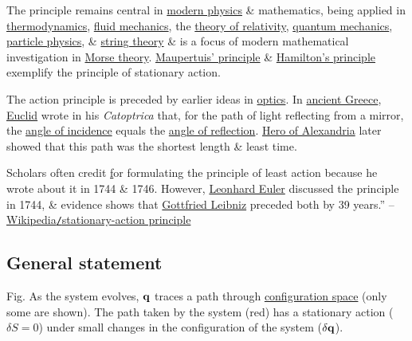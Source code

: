 \documentclass[oneside]{book}
\numberwithin{equation}{section}
\begin{document}
The principle remains central in \href{https://en.wikipedia.org/wiki/Modern_physics}{modern physics} \& mathematics, being applied in \href{https://en.wikipedia.org/wiki/Thermodynamics}{thermodynamics}, \href{https://en.wikipedia.org/wiki/Fluid_mechanics}{fluid mechanics}, the \href{https://en.wikipedia.org/wiki/Theory_of_relativity}{theory of relativity}, \href{https://en.wikipedia.org/wiki/Quantum_mechanics}{quantum mechanics}, \href{https://en.wikipedia.org/wiki/Particle_physics}{particle physics}, \& \href{https://en.wikipedia.org/wiki/String_theory}{string theory} \& is a focus of modern mathematical investigation in \href{https://en.wikipedia.org/wiki/Morse_theory}{Morse theory}. \href{https://en.wikipedia.org/wiki/Maupertuis%27_principle}{Maupertuis' principle} \& \href{https://en.wikipedia.org/wiki/Hamilton%27s_principle}{Hamilton's principle} exemplify the principle of stationary action.

The action principle is preceded by earlier ideas in \href{https://en.wikipedia.org/wiki/Optics}{optics}. In \href{https://en.wikipedia.org/wiki/Ancient_Greece}{ancient Greece}, \href{https://en.wikipedia.org/wiki/Euclid}{Euclid} wrote in his \textit{Catoptrica} that, for the path of light reflecting from a mirror, the \href{https://en.wikipedia.org/wiki/Angle_of_incidence_(optics)}{angle of incidence} equals the \href{https://en.wikipedia.org/wiki/Angle_of_reflection}{angle of reflection}. \href{https://en.wikipedia.org/wiki/Hero_of_Alexandria}{Hero of Alexandria} later showed that this path was the shortest length \& least time.

Scholars often credit \href{Pierre Louis Maupertuis} for formulating the principle of least action because he wrote about it in 1744 \& 1746. However, \href{https://en.wikipedia.org/wiki/Leonhard_Euler}{Leonhard Euler} discussed the principle in 1744, \& evidence shows that \href{https://en.wikipedia.org/wiki/Gottfried_Leibniz}{Gottfried Leibniz} preceded both by 39 years.'' -- \href{https://en.wikipedia.org/wiki/Stationary-action_principle}{Wikipedia\texttt{/}stationary-action principle}

\subsection{General statement}
\textsf{Fig. As the system evolves, ${\bf q}$ traces a path through \href{https://en.wikipedia.org/wiki/Configuration_space_(physics)}{configuration space} (only some are shown). The path taken by the system (red) has a stationary action ($\delta S = 0$) under small changes in the configuration of the system ($\delta{\bf q}$).}
\end{document}
